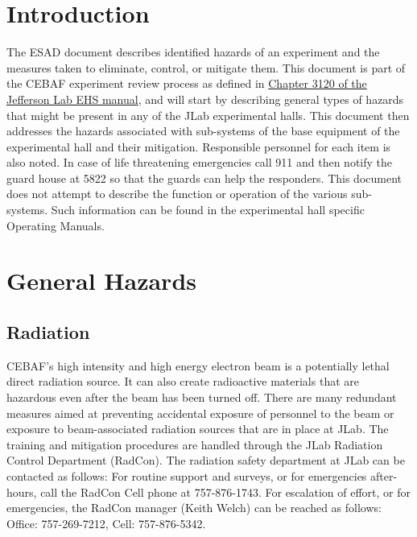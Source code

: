 
%
%
%

\chapter{Introduction}

The ESAD document describes identified hazards of an experiment and the measures taken to eliminate, control, or mitigate them.
This document is part of the CEBAF experiment review process as defined in
\href{http://www.jlab.org/ehs/ehsmanual/manual/3120.html}{Chapter 3120 of the Jefferson Lab EHS manual},
and will start by describing general types of hazards that might be present in any of the  
JLab experimental halls.  This document then addresses the hazards associated 
with sub-systems of the base equipment of the experimental hall and their 
mitigation.  Responsible personnel for each item is also noted.  
In case of life threatening 
emergencies call 911 and then notify the guard house at 5822 so that the guards can help
the responders.  This document does not attempt to describe the function 
or operation of the various sub-systems. Such information can be found in
the experimental hall specific Operating Manuals.


\chapter{General Hazards}
\label{chap:generalhazards}
\section{Radiation}
	
CEBAF's high intensity and high energy electron beam is a potentially lethal direct radiation source. 
It can also create radioactive materials that are hazardous even  after the beam has been turned off. 
There are many redundant measures aimed at preventing accidental exposure of personnel to the beam 
or exposure to beam-associated radiation sources that are in place at JLab. The training and mitigation 
procedures are handled through the JLab Radiation Control Department (RadCon). The radiation safety 
department at JLab can be contacted as follows: For routine support and surveys, or for emergencies 
after-hours, call the RadCon Cell phone at 757-876-1743. For escalation of effort, or for emergencies, 
the RadCon manager (Keith Welch) can be reached as follows: Office: 757-269-7212, Cell: 757-876-5342.

